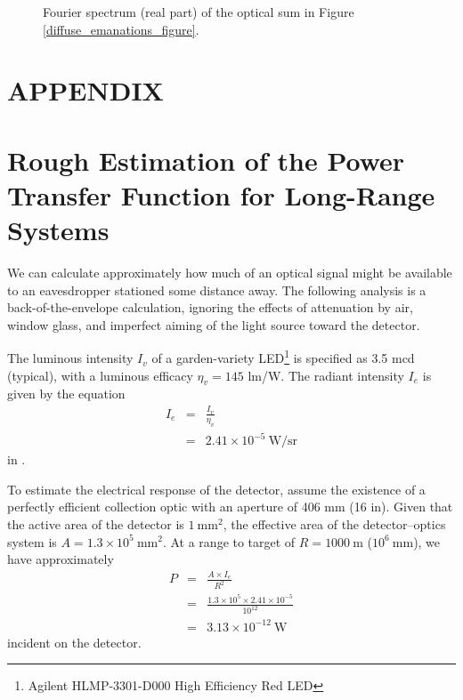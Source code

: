 \documentclass{acmtrans2e}
\begin{document}
\begin{figure}
\centering
\caption{Fourier spectrum (real part) of the optical sum in Figure
\ref{diffuse_emanations_figure}.}
\label{fourier_spectrum_figure}
\end{figure}

\appendix
\section*{APPENDIX}

\section{Rough Estimation of the Power Transfer Function for Long-Range
Systems}\label{appendix:power}

We can calculate approximately how much of an optical signal might be
available to an eavesdropper stationed some distance away.  The following
analysis is a back-of-the-envelope calculation, ignoring the effects of
attenuation by air, window glass, and imperfect aiming of the light source
toward the detector.

The luminous intensity $I_v$ of a garden-variety
LED\footnote{Agilent HLMP-3301-D000 High Efficiency Red LED}
is specified as 3.5 mcd (typical), with a luminous efficacy $\eta_v = 145$
lm/W.  The radiant intensity $I_e$ is given by the equation
\begin{eqnarray}
    I_e & = & \frac{I_v}{\eta_v} \\
        & = & 2.41 \times 10^{-5} \ \mathrm{W/sr} \nonumber
\end{eqnarray}
in \cite{agilent_led_data_sheet}.

To estimate the electrical response of the detector, assume the existence
of a perfectly efficient collection optic with an aperture of 406 mm
(16 in).  Given that the active area of the detector is
$1 \ \mathrm{mm}^2$, the effective area of the detector--optics system
is $A=1.3 \times 10^5 \ \mathrm{mm}^2$.  At a range to target of
$R=1000 \ \mathrm{m}$ ($10^6 \ \mathrm{mm}$), we have approximately
\begin{eqnarray}
    P & = & \frac{A \times I_e}{R^2} \\
      & = & \frac{1.3 \times 10^5 \times 2.41 \times 10^{-5}}{10^{12}} \nonumber \\
      & = & 3.13 \times 10^{-12} \ \mathrm{W} \nonumber
\end{eqnarray}
incident on the detector.
\end{document}
